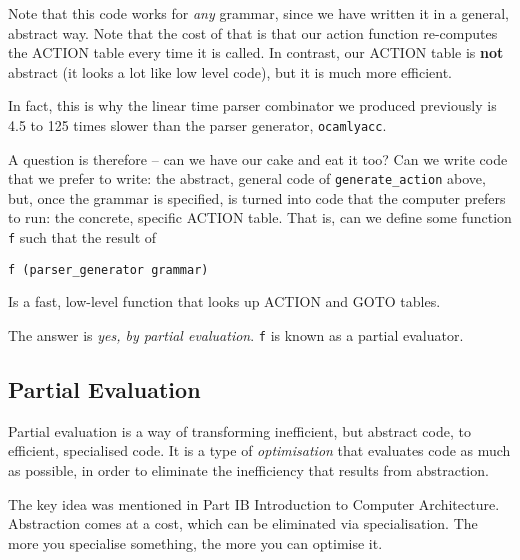 Note that this code works for \textit{any} grammar, since we have written it in a general, abstract way. Note that the cost of that is that our action function re-computes the ACTION table every time it is called. In contrast, our ACTION table is \textbf{not} abstract (it looks a lot like low level code), but it is much more efficient. 

In fact, this is why the linear time parser combinator we produced previously is 4.5 to 125 times slower than the parser generator, \texttt{ocamlyacc}. 

A question is therefore -- can we have our cake and eat it too? Can we write code that we prefer to write: the abstract, general code of \texttt{generate\_action} above, but, once the grammar is specified, is turned into code that the computer prefers to run: the concrete, specific ACTION table. That is, can we define some function \texttt{f} such that the result of
\begin{verbatim}
f (parser_generator grammar)
\end{verbatim}
Is a fast, low-level function that looks up ACTION and GOTO tables.

The answer is \textit{yes, by partial evaluation}. \texttt{f} is known as a partial evaluator.

\subsection{Partial Evaluation}
Partial evaluation is a way of transforming inefficient, but abstract code, to efficient, specialised code. It is a type of \textit{optimisation} that evaluates code as much as possible, in order to eliminate the inefficiency that results from abstraction. 

The key idea was mentioned in \textsf{Part IB Introduction to Computer Architecture}. Abstraction comes at a cost, which can be eliminated via specialisation. The more you specialise something, the more you can optimise it.

